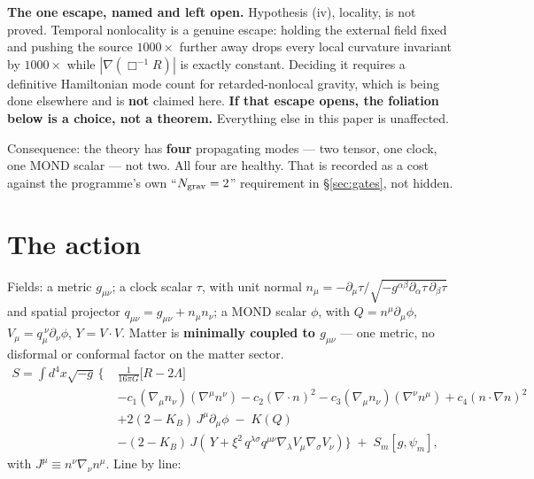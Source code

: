 \documentclass[11pt,letterpaper]{article}
\begin{document}
\textbf{The one escape, named and left open.} Hypothesis (iv), locality, is not proved. Temporal nonlocality is a genuine escape: holding the external field fixed and pushing the source $1000\times$ further away drops every local curvature invariant by $1000\times$ while $|\nabla(\Box^{-1}R)|$ is exactly constant. Deciding it requires a definitive Hamiltonian mode count for retarded-nonlocal gravity, which is being done elsewhere and is \textbf{not} claimed here. \textbf{If that escape opens, the foliation below is a choice, not a theorem.} Everything else in this paper is unaffected.

Consequence: the theory has \textbf{four} propagating modes --- two tensor, one clock, one MOND scalar --- not two. All four are healthy. That is recorded as a cost against the programme's own ``$N_{\rm grav}=2$'' requirement in \S\ref{sec:gates}, not hidden.

\section{The action}
Fields: a metric $g_{\mu\nu}$; a clock scalar $\tau$, with unit normal $n_\mu=-\partial_\mu\tau/\sqrt{-g^{\alpha\beta}\partial_\alpha\tau\,\partial_\beta\tau}$ and spatial projector $q_{\mu\nu}=g_{\mu\nu}+n_\mu n_\nu$; a MOND scalar $\phi$, with $Q=n^\mu\partial_\mu\phi$, $V_\mu=q_\mu^{\ \nu}\partial_\nu\phi$, $Y=V\!\cdot\!V$. Matter is \textbf{minimally coupled to $g_{\mu\nu}$} --- one metric, no disformal or conformal factor on the matter sector.
\begin{align}
S=\int\! d^4x\sqrt{-g}\,\Big\{\;&\frac{1}{16\pi G}\big[R-2\Lambda\big]\nonumber\\
&-c_1(\nabla_\mu n_\nu)(\nabla^\mu n^\nu)-c_2(\nabla\!\cdot\!n)^2-c_3(\nabla_\mu n_\nu)(\nabla^\nu n^\mu)+c_4(n\!\cdot\!\nabla n)^2\nonumber\\
&+2(2-K_B)\,J^\mu\partial_\mu\phi\;-\;K(Q)\nonumber\\
&-(2-K_B)\,J\!\left(\,Y+\xi^2\,q^{\lambda\sigma}q^{\mu\nu}\nabla_\lambda V_\mu\nabla_\sigma V_\nu\right)\Big\}\;+\;S_m[g,\psi_m],
\end{align}
with $J^\mu\equiv n^\nu\nabla_\nu n^\mu$. Line by line:
\end{document}
